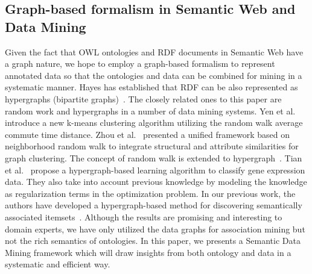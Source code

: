 

\subsection{Graph-based formalism in Semantic Web and Data Mining}

Given the fact that OWL ontologies and RDF documents in Semantic Web have a graph nature, we hope to employ a graph-based formalism to represent annotated data so that the ontologies and data can be combined for mining in a systematic manner. Hayes has established that RDF can be also represented as hypergraphs (bipartite graphs)~\cite{GraphModelRDF}. The closely related ones to this paper are random work and hypergraphs in a number of data mining systems.
Yen et al.~\cite{Yen05clusteringusing} introduce a new k-means clustering algorithm utilizing the random walk average commute time distance. Zhou et al.~\cite{Zhou:2009:GCB:1687627.1687709} presented a unified framework based on neighborhood random walk to integrate structural and attribute similarities for graph clustering. The concept of random walk is extended to hypergraph~\cite{Zhou06learningwith}. Tian et al.~\cite{Tian09} propose a hypergraph-based learning algorithm to classify gene expression data. They also take into account previous knowledge by modeling the knowledge as regularization terms in the optimization problem.
In our previous work, the authors have developed a hypergraph-based method for discovering semantically associated itemsets~\cite{LiuEtal11}. Although the results are promising and interesting to domain experts, we have only utilized the data graphs for association mining but not the rich semantics of ontologies. In this paper,  we presents a Semantic Data Mining framework which will draw insights from both ontology and data in a systematic and efficient way.

